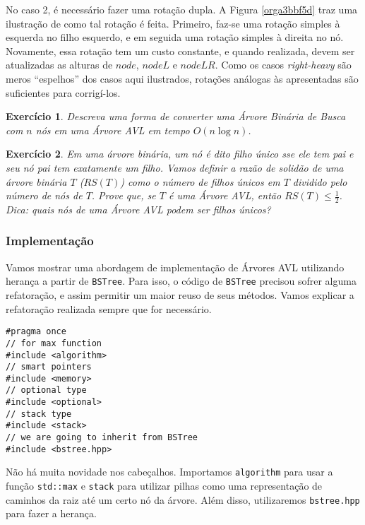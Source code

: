 \documentclass[11pt]{article}
\newtheorem{exercicio}{Exercício}
\begin{document}
No caso 2, é necessário fazer uma rotação dupla.  A Figura
\ref{orga3bbf5d} traz uma ilustração de como tal rotação é feita.
Primeiro, faz-se uma rotação simples à esquerda no filho esquerdo,
e em seguida uma rotação simples à direita no nó.  Novamente, essa
rotação tem um custo constante, e quando realizada, devem ser
atualizadas as alturas de \(node\), \(nodeL\) e \(nodeLR\).  Como os
casos \emph{right-heavy} são meros ``espelhos'' dos casos aqui
ilustrados, rotações análogas às apresentadas são suficientes para
corrigí-los.

\begin{exercicio}
Descreva uma forma de converter uma Árvore Binária de Busca com
\(n\) nós em uma Árvore AVL em tempo \(O(n \log n)\).
\end{exercicio}

\begin{exercicio}
Em uma árvore binária, um nó é dito filho único sse ele tem pai e
seu nó pai tem exatamente um filho.  Vamos definir a \emph{razão de
solidão} de uma árvore binária \(T\) (\(RS(T)\)) como o número de
filhos únicos em \(T\) dividido pelo número de nós de \(T\).  Prove
que, se \(T\) é uma Árvore AVL, então \(RS(T) \leq \frac{1}{2}\).
Dica: quais nós de uma Árvore AVL podem ser filhos únicos?
\end{exercicio}

\clearpage

\subsubsection{Implementação}
\label{sec:org6ff4c56}

Vamos mostrar uma abordagem de implementação de Árvores AVL
utilizando herança a partir de \texttt{BSTree}.  Para isso, o código de
\texttt{BSTree} precisou sofrer alguma refatoração, e assim permitir um
maior reuso de seus métodos.  Vamos explicar a refatoração
realizada sempre que for necessário.

\begin{verbatim}
#pragma once
// for max function
#include <algorithm>
// smart pointers
#include <memory>
// optional type
#include <optional>
// stack type
#include <stack>
// we are going to inherit from BSTree
#include <bstree.hpp>
\end{verbatim}

Não há muita novidade nos cabeçalhos.  Importamos \texttt{algorithm} para
usar a função \texttt{std::max} e \texttt{stack} para utilizar pilhas como uma
representação de caminhos da raiz até um certo nó da árvore.  Além
disso, utilizaremos \texttt{bstree.hpp} para fazer a herança.
\end{document}
